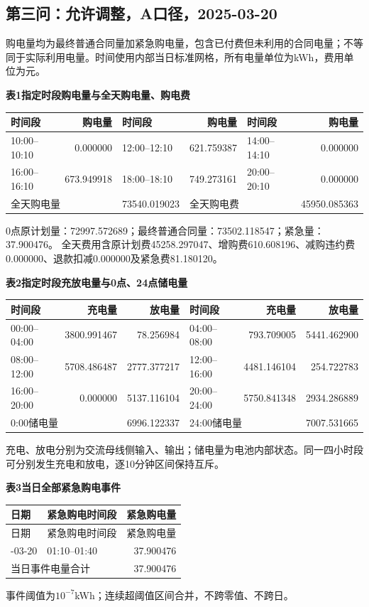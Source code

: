 \subsection{第三问：允许调整，A口径，2025-03-20}
\begingroup\small
\setlength{\tabcolsep}{4pt}\renewcommand{\arraystretch}{1.08}
\setlength{\LTpre}{4pt}\setlength{\LTpost}{4pt}
\noindent 购电量均为最终普通合同量加紧急购电量，包含已付费但未利用的合同电量；不等同于实际利用电量。时间使用内部当日标准网格，所有电量单位为kWh，费用单位为元。
\begin{center}\textbf{表1\quad 指定时段购电量与全天购电量、购电费}\par\smallskip
\begin{tabular}{lr lr lr}\toprule
时间段 & 购电量 & 时间段 & 购电量 & 时间段 & 购电量\\\midrule
10:00--10:10 & 0.000000 & 12:00--12:10 & 621.759387 & 14:00--14:10 & 0.000000\\
16:00--16:10 & 673.949918 & 18:00--18:10 & 749.273161 & 20:00--20:10 & 0.000000\\
\midrule
\multicolumn{2}{l}{全天购电量} & 73540.019023 & \multicolumn{2}{l}{全天购电费} & 45950.085363\\
\bottomrule\end{tabular}\end{center}
\noindent 0点原计划量：72997.572689；最终普通合同量：73502.118547；紧急量：37.900476。
全天费用含原计划费45258.297047、增购费610.608196、减购违约费0.000000、退款扣减0.000000及紧急费81.180120。
\begin{center}\textbf{表2\quad 指定时段充放电量与0点、24点储电量}\par\smallskip
\begin{tabular}{lrr lrr}\toprule
时间段 & 充电量 & 放电量 & 时间段 & 充电量 & 放电量\\\midrule
00:00--04:00 & 3800.991467 & 78.256984 & 04:00--08:00 & 793.709005 & 5441.462900\\
08:00--12:00 & 5708.486487 & 2777.377217 & 12:00--16:00 & 4481.146104 & 254.722783\\
16:00--20:00 & 0.000000 & 5137.116104 & 20:00--24:00 & 5750.841348 & 2934.286889\\
\midrule
\multicolumn{2}{l}{0:00储电量} & 6996.122337 & \multicolumn{2}{l}{24:00储电量} & 7007.531665\\
\bottomrule\end{tabular}\end{center}
\noindent 充电、放电分别为交流母线侧输入、输出；储电量为电池内部状态。同一四小时段可分别发生充电和放电，逐10分钟区间保持互斥。
\begin{center}\textbf{表3\quad 当日全部紧急购电事件}\end{center}
\begin{longtable}{llr}\toprule 日期 & 紧急购电时间段 & 紧急购电量\\\midrule\endfirsthead
\toprule 日期 & 紧急购电时间段 & 紧急购电量\\\midrule\endhead
\bottomrule\endfoot
2025-03-20 & 01:10--01:40 & 37.900476\\
\midrule\multicolumn{2}{l}{当日事件电量合计} & 37.900476\\
\end{longtable}
\noindent 事件阈值为$10^{-7}$kWh；连续超阈值区间合并，不跨零值、不跨日。
\endgroup
\clearpage
